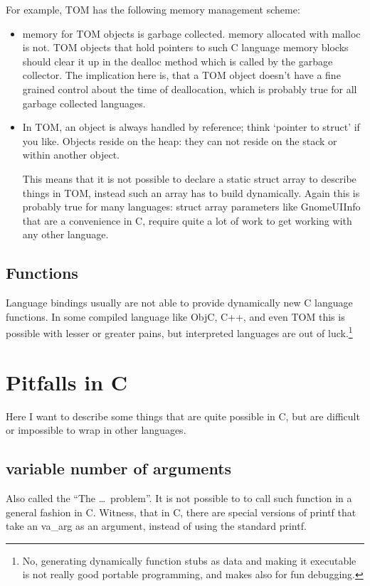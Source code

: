 \documentclass{article}
\begin{document}
For example, TOM has the following memory management scheme:
\begin{itemize}
\item memory for TOM objects is garbage collected. memory allocated
      with malloc is not. TOM objects that hold pointers to such C
      language memory blocks should clear it up in the dealloc method
      which is called by the garbage collector.
      The implication here is, that a TOM object doesn't have a fine
      grained control about the time of deallocation, which is
      probably true for all garbage collected languages.
\item 
        In TOM, an object is always handled by reference; think `pointer
        to struct' if you like.  Objects reside on the heap: they can not
        reside on the stack or within another object.

      This means that it is not possible to declare a static struct array to
      describe things in TOM, instead such an array has to build
      dynamically. Again this is probably true for many languages:
      struct array parameters like GnomeUIInfo that are a convenience
      in C, require quite a lot of work to get working with any other language.
\end{itemize}

\subsection{Functions}

Language bindings usually are not able to provide dynamically new C
language functions. In some compiled language like ObjC, C++, and even
TOM this is possible with lesser or greater pains, but interpreted
languages are out of luck.\footnote{No, generating dynamically
function stubs as data and making it executable is not really good
portable programming, and makes also for fun debugging.}

\section{Pitfalls in C}

Here I want to describe some things that are quite possible in C, but
are difficult or impossible to wrap in other languages.

\subsection{variable number of arguments}
Also called the ``The \dots\ problem''. It is not possible to to call
such function in a general fashion in C. Witness, that in C, there are
special versions of printf that take an va\_arg as an argument,
instead of using the standard printf.
\end{document}
